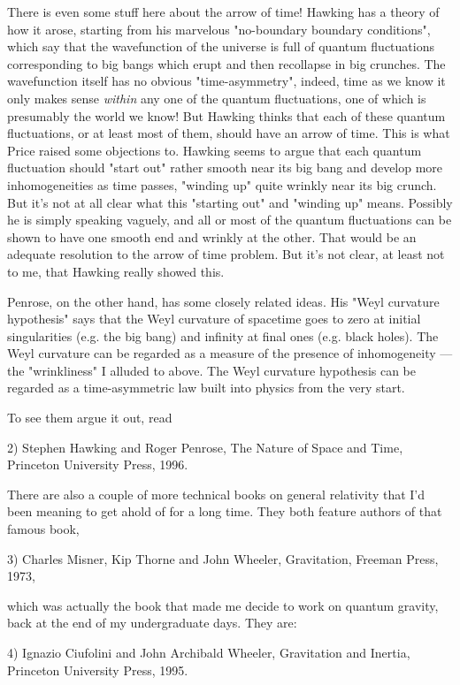There is even some stuff here about the arrow of time!  Hawking has a
theory of how it arose, starting from his marvelous "no-boundary
boundary conditions", which say that the wavefunction of the universe is
full of quantum fluctuations corresponding to big bangs which erupt and
then recollapse in big crunches.  The wavefunction itself has no obvious
"time-asymmetry", indeed, time as we know it only makes sense
\emph{within} any one of the quantum fluctuations, one of which is presumably
the world we 
know!  But Hawking thinks that each of these quantum fluctuations, or at
least most of them, should have an arrow of time.  This is what Price
raised some objections to.  Hawking seems to argue that each quantum
fluctuation should "start out" rather smooth near its big bang and
develop more inhomogeneities as time passes, "winding up"
quite wrinkly near its big crunch.  But it's not at all clear what this
"starting out" 
and "winding up" means.  Possibly he is simply speaking
vaguely, and all 
or most of the quantum fluctuations can be shown to have one smooth end
and wrinkly at the other.  That would be an adequate resolution to the
arrow of time problem.  But it's not clear, at least not to me, that
Hawking really showed this.

Penrose, on the other hand, has some closely related ideas.  His "Weyl
curvature hypothesis" says that the Weyl curvature of spacetime goes to
zero at initial singularities (e.g. the big bang) and infinity at final
ones (e.g. black holes).  The Weyl curvature can be regarded as a
measure of the presence of inhomogeneity --- the "wrinkliness"
I alluded to above.  The Weyl curvature hypothesis can be regarded as a
time-asymmetric law built into physics from the very start.

To see them argue it out, read

2) Stephen Hawking and Roger Penrose, The Nature of Space and Time,
Princeton University Press, 1996.


There are also a couple of more technical books on general relativity
that I'd been meaning to get ahold of for a long time.  They both
feature authors of that famous book,

3) Charles Misner, Kip Thorne and John Wheeler, Gravitation, Freeman
Press, 1973,

which was actually the book that made me decide to work on quantum
gravity, back at the end of my undergraduate days.  They are:

4) Ignazio Ciufolini and John Archibald Wheeler, Gravitation and
Inertia, Princeton University Press, 1995.

